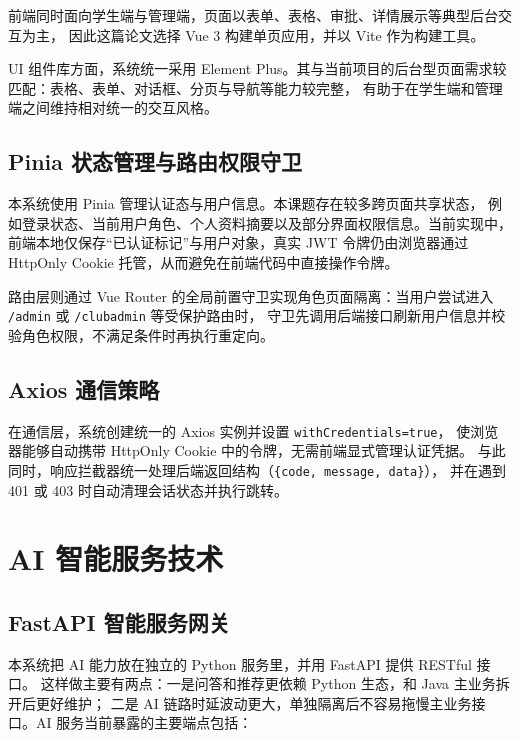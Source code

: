 前端同时面向学生端与管理端，页面以表单、表格、审批、详情展示等典型后台交互为主，
因此这篇论文选择 Vue 3 构建单页应用，并以 Vite 作为构建工具\cite{vue3docs}。

UI 组件库方面，系统统一采用 Element Plus。其与当前项目的后台型页面需求较匹配：表格、表单、对话框、分页与导航等能力较完整，
有助于在学生端和管理端之间维持相对统一的交互风格。

\subsection{Pinia 状态管理与路由权限守卫}

本系统使用 Pinia 管理认证态与用户信息。本课题存在较多跨页面共享状态，
例如登录状态、当前用户角色、个人资料摘要以及部分界面权限信息。当前实现中，
前端本地仅保存“已认证标记”与用户对象，真实 JWT 令牌仍由浏览器通过 HttpOnly Cookie 托管，从而避免在前端代码中直接操作令牌。

路由层则通过 Vue Router 的全局前置守卫实现角色页面隔离：当用户尝试进入 \texttt{/admin} 或 \texttt{/clubadmin} 等受保护路由时，
守卫先调用后端接口刷新用户信息并校验角色权限，不满足条件时再执行重定向。

\subsection{Axios 通信策略}

在通信层，系统创建统一的 Axios 实例并设置 \texttt{with}\allowbreak\texttt{Credentials}\allowbreak\texttt{=true}，
使浏览器能够自动携带 HttpOnly\allowbreak{} Cookie 中的令牌，无需前端显式管理认证凭据。
与此同时，响应拦截器统一处理后端返回结构（\texttt{\{code, message, data\}}），
并在遇到 401 或 403 时自动清理会话状态并执行跳转。

\section{AI 智能服务技术}

\subsection{FastAPI 智能服务网关}

本系统把 AI 能力放在独立的 Python 服务里，并用 FastAPI 提供 RESTful 接口\cite{fastapi2020}。
这样做主要有两点：一是问答和推荐更依赖 Python 生态，和 Java 主业务拆开后更好维护；
二是 AI 链路时延波动更大，单独隔离后不容易拖慢主业务接口。AI 服务当前暴露的主要端点包括：

